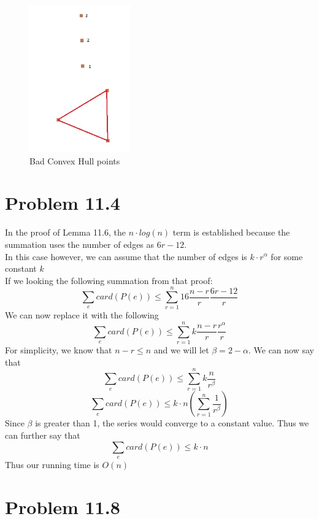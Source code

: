 \documentclass[11pt,psfig]{article}
\begin{document}
\begin{figure}[H]
\centering
\includegraphics[height=2.5in]{hw8prob1diagram.jpg}
\caption{Bad Convex Hull points}
\end{figure}

\newpage

\section*{Problem 11.4}

In the proof of Lemma 11.6, the $n \cdot log(n)$ term is established because the summation uses the number of edges as $6r-12$. \\
In this case however, we can assume that the number of edges is $k \cdot r^{\alpha}$ for some constant $k$ \\
If we looking the following summation from that proof:
\[
\sum_{e} card(P(e)) \leq \sum_{r=1}^n 16 \frac{n-r}{r} \frac{6r-12}{r}
\]
We can now replace it with the following
\[
\sum_{e} card(P(e)) \leq \sum_{r=1}^n k \frac{n-r}{r} \frac{r^{\alpha}}{r}
\]
For simplicity, we know that $n-r \leq n$ and we will let $\beta=2-\alpha$. We can now say that
\[
\sum_{e} card(P(e)) \leq \sum_{r=1}^n k \frac{n}{r^{\beta}}
\]
\[
\sum_{e} card(P(e)) \leq k \cdot n (\sum_{r=1}^n \frac{1}{r^{\beta}})
\]
Since $\beta$ is greater than 1, the series would converge to a constant value. Thus we can further say that
\[
\sum_{e} card(P(e)) \leq k \cdot n
\] 
Thus our running time is $O(n)$

\newpage

\section*{Problem 11.8}
\end{document}
